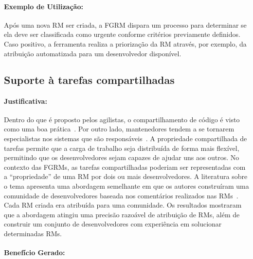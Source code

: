 \paragraph{Exemplo de Utilização:}
\label{par:exemplo_de_utilização_s07}

Após uma nova RM ser criada, a FGRM dispara um processo para determinar se ela
deve ser classificada como urgente conforme critérios previamente definidos.
Caso positivo, a ferramenta realiza a priorização da RM através, por exemplo,
da atribuição automatizada para um desenvolvedor disponível.

\subsection{Suporte à tarefas compartilhadas}
\label{sub:suporte_tarefas_compartilhadas}


\paragraph{Justificativa:}
\label{par:justificativa_s08}

Dentro do que é proposto pelos agilistas, o compartilhamento de código é visto
como uma boa prática~\cite{meyer2014agile}. Por outro lado, mantenedores tendem
a se tornarem especialistas nos sistemas que são
responsáveis~\cite{singer1998practices}. A propriedade compartilhada de tarefas
permite que a carga de trabalho seja distribuída de forma mais flexível,
permitindo que os desenvolvedores sejam capazes de ajudar uns aos outros. No
contexto das FGRMs, as tarefas compartilhadas poderiam ser representadas com a
``propriedade'' de uma RM por dois ou mais desenvolvedores. A literatura sobre
o tema apresenta uma abordagem semelhante em que os autores construíram uma
comunidade de desenvolvedores baseada nos comentários realizados nas
RMs~\cite{banitaan2013decoba}. Cada RM criada era atribuída para uma
comunidade. Os resultados mostraram que a abordagem atingiu uma precisão
razoável de atribuição de RMs, além de construir um conjunto de desenvolvedores
com experiência em solucionar determinadas RMs.

\paragraph{Benefício Gerado:}
\label{par:papéis_afetados_s08}

